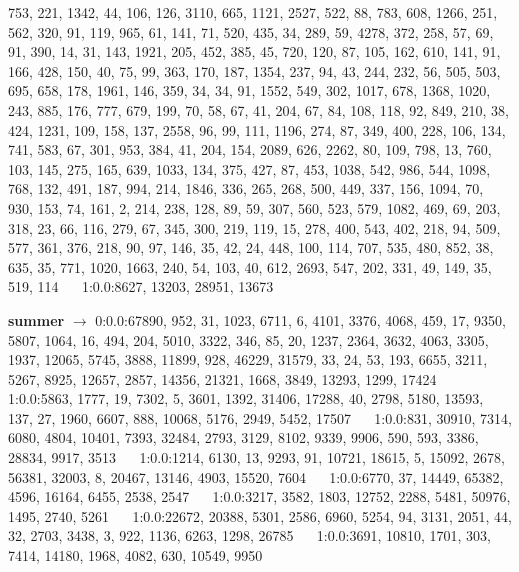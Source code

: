 \documentclass[a4paper,11pt,oneside]{book}
\begin{document}
753, 221, 1342, 44, 106, 126, 3110, 665, 1121, 2527, 522, 88, 783, 608, 1266, 251, 562, 320, 91, 119, 965, 61, 141, 71, 520, 435, 34, 289, 59, 4278, 372, 258, 57, 69, 91, 390, 14, 31, 143, 1921, 205, 452, 385, 45, 720, 120, 87, 105, 162, 610, 141, 91, 166, 428, 150, 40, 75, 99, 363, 170, 187, 1354, 237, 94, 43, 244, 232, 56, 505, 503, 695, 658, 178, 1961, 146, 359, 34, 34, 91, 1552, 549, 302, 1017, 678, 1368, 1020, 243, 885, 176, 777, 679, 199, 70, 58, 67, 41, 204, 67, 84, 108, 118, 92, 849, 210, 38, 424, 1231, 109, 158, 137, 2558, 96, 99, 111, 1196, 274, 87, 349, 400, 228, 106, 134, 741, 583, 67, 301, 953, 384, 41, 204, 154, 2089, 626, 2262, 80, 109, 798, 13, 760, 103, 145, 275, 165, 639, 1033, 134, 375, 427, 87, 453, 1038, 542, 986, 544, 1098, 768, 132, 491, 187, 994, 214, 1846, 336, 265, 268, 500, 449, 337, 156, 1094, 70, 930, 153, 74, 161, 2, 214, 238, 128, 89, 59, 307, 560, 523, 579, 1082, 469, 69, 203, 318, 23, 66, 116, 279, 67, 345, 300, 219, 119, 15, 278, 400, 543, 402, 218, 94, 509, 577, 361, 376, 218, 90, 97, 146, 35, 42, 24, 448, 100, 114, 707, 535, 480, 852, 38, 635, 35, 771, 1020, 1663, 240, 54, 103, 40, 612, 2693, 547, 202, 331, 49, 149, 35, 519, 114	$\quad$	1:0.0:8627, 13203, 28951, 13673

\textbf{summer} $\rightarrow$	0:0.0:67890, 952, 31, 1023, 6711, 6, 4101, 3376, 4068, 459, 17, 9350, 5807, 1064, 16, 494, 204, 5010, 3322, 346, 85, 20, 1237, 2364, 3632, 4063, 3305, 1937, 12065, 5745, 3888, 11899, 928, 46229, 31579, 33, 24, 53, 193, 6655, 3211, 5267, 8925, 12657, 2857, 14356, 21321, 1668, 3849, 13293, 1299, 17424	$\quad$	1:0.0:5863, 1777, 19, 7302, 5, 3601, 1392, 31406, 17288, 40, 2798, 5180, 13593, 137, 27, 1960, 6607, 888, 10068, 5176, 2949, 5452, 17507	$\quad$	1:0.0:831, 30910, 7314, 6080, 4804, 10401, 7393, 32484, 2793, 3129, 8102, 9339, 9906, 590, 593, 3386, 28834, 9917, 3513	$\quad$	1:0.0:1214, 6130, 13, 9293, 91, 10721, 18615, 5, 15092, 2678, 56381, 32003, 8, 20467, 13146, 4903, 15520, 7604	$\quad$	1:0.0:6770, 37, 14449, 65382, 4596, 16164, 6455, 2538, 2547	$\quad$	1:0.0:3217, 3582, 1803, 12752, 2288, 5481, 50976, 1495, 2740, 5261	$\quad$	1:0.0:22672, 20388, 5301, 2586, 6960, 5254, 94, 3131, 2051, 44, 32, 2703, 3438, 3, 922, 1136, 6263, 1298, 26785	$\quad$	1:0.0:3691, 10810, 1701, 303, 7414, 14180, 1968, 4082, 630, 10549, 9950
\end{document}
